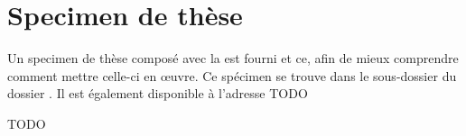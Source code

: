 \chapter{Specimen de thèse}\label{cha:specimen}

Un specimen de thèse composé avec la \yatcl est fourni et ce, afin de mieux
comprendre comment mettre celle-ci en œuvre. Ce spécimen se trouve dans le
sous-dossier  du dossier . Il
est également disponible à l'adresse TODO

TODO

%
\iffalse
\fi
